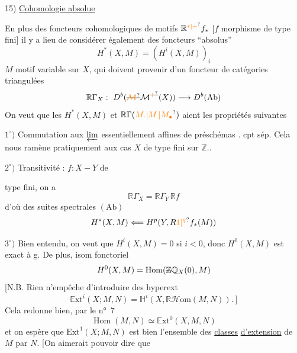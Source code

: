 15) \uline{Cohomologie absolue}

En plus des foncteurs cohomologiques de motifs $\mathbb R^{\unsure{*|+}}f_*$ [$f$ morphisme de type fini] il y a lieu de considérer également des foncteurs ``absolus''
\[
H^*(X,M)=(H^i(X,M))_i
\]
$M$ motif variable sur $X$, qui doivent provenir d'un foncteur de catégories triangulées
\[
\mathbb R\Gamma_X:\ D^b(\deleted{\unsure{\mathcal M}}\mathcal M^{\deleted{\unsure{+}}}(X))\longrightarrow D^b(\mathrm{Ab})
\]
On veut que les $H^*(X,M)$ et $\mathbb R\Gamma(\unsure{M.|M_.|M_{\bullet}})$ aient les propriétés suivantes

$1^\circ)$ Commutation aux $\varprojlim$ essentiellement affines de préschémas .  cpt  sép. Cela nous ramène pratiquement aux cas $X$ de type fini sur $\mathbb Z$..

$2^\circ)$ Transitivité :  $f:X\mathbin{-}Y$ de



type fini, on a
\[
\mathbb R\Gamma_X=\mathbb R\Gamma_Y\,\mathbb R f
\]
d'où des suites spectrales  $(\mathrm{Ab})$
\[
H^*(X,M)\Longleftarrow H^p(Y,R\unsure{1|{}^q}f_*(M))
\]

$3^\circ)$ Bien entendu, on veut que $H^i(X,M)=0$ si $i<0$, donc $H^0(X,M)$ est exact à g. De plus, isom fonctoriel
\[
H^0(X,M)=\operatorname{Hom}(\deleted{\mathbb Z}\mathbb Q_X(0),M)
\]
[N.B. Rien n'empêche d'introduire des hyperext
\[
\mathbb E\mathrm{xt}^i(X;M,N)=\mathbb H^i(X,\mathbb R\mathcal H\mathrm{om}(M,N)).\ ]
\]
Cela redonne bien, par le n°~7
\[
\operatorname{Hom}(M,N)\simeq\mathbb E\mathrm{xt}^0(X,M,N)
\]
et on espère que $\mathrm{Ext}^{1}(X;M,N)$ est bien l'ensemble des \uline{classes} \uline{d'extension} de $M$ par $N$. [On aimerait pouvoir dire que

